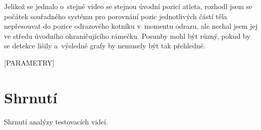 Jelikož se jednalo o~stejné video se stejnou úvodní pozicí atleta, rozhodl jsem se počátek souřadného systému pro porovnání pozic jednotlivých částí těla nepřesouvat do pozice odrazového kotníku v~momentu odrazu, ale nechal jsem jej ve středu úvodního ohraničujícího rámečku. Posunby mohl být různý, pokud by se detekce lišily a~výsledné grafy by nemusely být tak přehledné.

[PARAMETRY]




\section{Shrnutí}
\label{sec:shrnuti}

Shrnutí analýzy testovacích videí.
